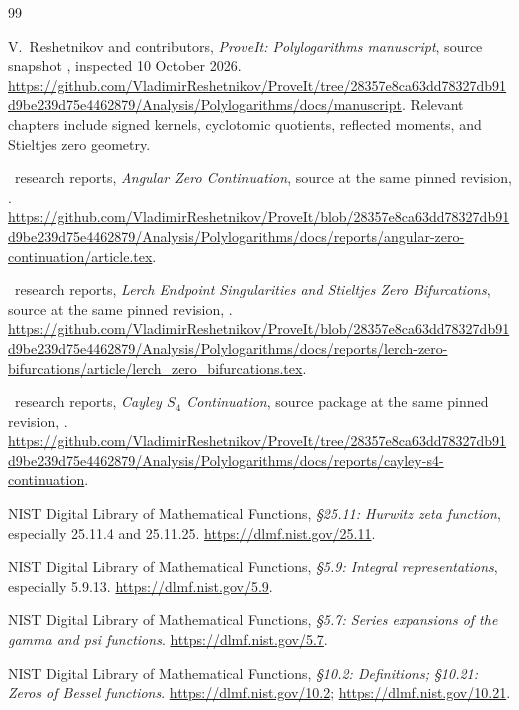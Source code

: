 \begin{thebibliography}{99}

V.~Reshetnikov and contributors,
\emph{ProveIt: Polylogarithms manuscript}, source snapshot
\baseline, inspected 10 October 2026.
\url{https://github.com/VladimirReshetnikov/ProveIt/tree/28357e8ca63dd78327db91d9be239d75e4462879/Analysis/Polylogarithms/docs/manuscript}.
Relevant chapters include signed kernels, cyclotomic quotients,
reflected moments, and Stieltjes zero geometry.

\repo\ research reports,
\emph{Angular Zero Continuation}, source at the same pinned revision,
.
\url{https://github.com/VladimirReshetnikov/ProveIt/blob/28357e8ca63dd78327db91d9be239d75e4462879/Analysis/Polylogarithms/docs/reports/angular-zero-continuation/article.tex}.

\repo\ research reports,
\emph{Lerch Endpoint Singularities and Stieltjes Zero Bifurcations},
source at the same pinned revision,
.
\url{https://github.com/VladimirReshetnikov/ProveIt/blob/28357e8ca63dd78327db91d9be239d75e4462879/Analysis/Polylogarithms/docs/reports/lerch-zero-bifurcations/article/lerch_zero_bifurcations.tex}.

\repo\ research reports,
\emph{Cayley $S_4$ Continuation}, source package at the same pinned
revision, .
\url{https://github.com/VladimirReshetnikov/ProveIt/tree/28357e8ca63dd78327db91d9be239d75e4462879/Analysis/Polylogarithms/docs/reports/cayley-s4-continuation}.

NIST Digital Library of Mathematical Functions,
\emph{\S25.11: Hurwitz zeta function}, especially 25.11.4 and
25.11.25. \url{https://dlmf.nist.gov/25.11}.

NIST Digital Library of Mathematical Functions,
\emph{\S5.9: Integral representations}, especially 5.9.13.
\url{https://dlmf.nist.gov/5.9}.

NIST Digital Library of Mathematical Functions,
\emph{\S5.7: Series expansions of the gamma and psi functions}.
\url{https://dlmf.nist.gov/5.7}.

NIST Digital Library of Mathematical Functions,
\emph{\S10.2: Definitions; \S10.21: Zeros of Bessel functions}.
\url{https://dlmf.nist.gov/10.2};
\url{https://dlmf.nist.gov/10.21}.


\end{thebibliography}
